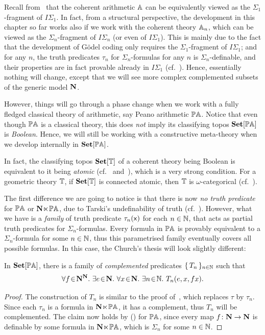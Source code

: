 Recall from~ that the coherent arithmetic $\mathbb{A}$ can be equivalently viewed as the $\Sigma_1$-fragment of $I\Sigma_1$. In fact, from a structural perspective, the development in this chapter so far works also if we work with the coherent theory $\mathbb{A}_n$, which can be viewed as the $\Sigma_n$-fragment of $I\Sigma_n$ (or even of $I\Sigma_1$). This is mainly due to the fact that the development of G\"odel coding only requires the $\Sigma_1$-fragment of $I\Sigma_1$; and for any $n$, the truth predicates $\tau_n$ for $\Sigma_n$-formulas for any $n$ is $\Sigma_n$-definable, and their properties are in fact provable already in $I\Sigma_1$ (cf.~\citet[\S I.1.(d)]{Hájek_Pudlák_2017}). Hence, essentially nothing will change, except that we will see more complex complemented subsets of the generic model $\mathbf N$. 

However, things will go through a phase change when we work with a fully fledged classical theory of arithmetic, say Peano arithmetic $\mathbb{PA}$. Notice that even though $\mathbb{PA}$ is a classical theory, this does \emph{not} imply its classifying topos $\mathbf{Set}[\mathbb{PA}]$ is \emph{Boolean}. Hence, we will still be working with a constructive meta-theory when we develop internally in $\mathbf{Set}[\mathbb{PA}]$. 

\begin{remark}\label{rem:Booleanclassifyingtopos}
  In fact, the classifying topos $\mathbf{Set}[\mathbb{T}]$ of a coherent theory being Boolean is equivalent to it being \emph{atomic} (cf.~\citet{blass_boolean_1983} and~\citet[D3.4]{johnstone2002sketches}), which is a very strong condition. For a geometric theory $\mathbb{T}$, if $\mathbf{Set}[\mathbb{T}]$ is connected atomic, then $\mathbb{T}$ is $\omega$-categorical (cf.~\citet{caramello2012atomic}).
\end{remark}

The first difference we are going to notice is that there is now \emph{no truth predicate} for $\mathbb{PA}$ or $\mathbf N\hspace{-.4ex}\ltimes\hspace{-.4ex}\mathbb{PA}$, due to Tarski's undefinability of truth (cf.~). However, what we have is a \emph{family} of truth predicate $\tau_n(\mathsf{x})$ for each $n\in\mathbb{N}$, that acts as partial truth predicates for $\Sigma_n$-formulas. Every formula in $\mathbb{PA}$ is provably equivalent to a $\Sigma_n$-formula for some $n\in\mathbb{N}$, thus this parametrised family eventually covers all possible formulas. In this case, the Church's thesis will look slightly different:

\begin{theorem}\label{thm:churchforPA}
  In $\mathbf{Set}[\mathbb{PA}]$, there is a family of \emph{complemented} predicates $\{\,T_n\,\}_{n\in\mathbb{N}}$ such that 
  \[ \fa f{\Nb^\Nb} \ex e{\Nb} \fa x{\Nb} \ex{n}{\N} T_n(e,x,fx). \]
\end{theorem}
\begin{proof}
  The construction of $T_n$ is similar to the proof of~, which replaces $\tau$ by $\tau_n$. Since each $\tau_n$ is a formula in $\mathbf N\hspace{-.4ex}\ltimes\hspace{-.4ex}\mathbb{PA}$, it has a complement, thus $T_n$ will be complemented. The claim now holds by (\AxiomSQCA) for $\mathbb{PA}$, since every map $f \colon \mathbf N \to \mathbf N$ is definable by some formula in $\mathbf N\hspace{-.4ex}\ltimes\hspace{-.4ex}\mathbb{PA}$, which is $\Sigma_n$ for some $n\in\mathbb{N}$. 
\end{proof}

